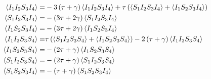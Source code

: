 \documentclass{report}
\begin{document}
 \begin{equation*}
 	\begin{aligned}	
 	\langle I_1I_2S_3I_4 \rangle = &- 3\left(  \tau +\gamma \right) \langle  I_1 I_2 S_3 I_4 \rangle + \tau \left( \langle  S_1 I_2 S_3 I_4  \rangle +\langle  I_1 S_2 S_3 I_4 \rangle \right) \\
 	\langle S_1I_2S_3I_4 \rangle=& -\left(  3\tau + 2\gamma \right)  	\langle S_1I_2S_3I_4 \rangle\\
 	\langle I_1S_2S_3I_4 \rangle=&-\left(  3\tau + 2\gamma \right)\langle I_1S_2S_3I_4 \rangle\\
 	\langle I_1I_2S_3S_4 \rangle=& \tau \left( \langle S_1 I_2 S_3S_4 \rangle +\langle  I_1 S_2 S_3S_4 \rangle \right) -2\left(  \tau+\gamma \right) \langle I_1I_2S_3S_4 \rangle\\
 	\langle I_1S_2S_3S_4 \rangle=&-\left(  2\tau + \gamma \right) \langle I_1S_2S_3S_4 \rangle\\
 	\langle S_1I_2S_3S_4 \rangle=&-\left(  2\tau + \gamma \right) \langle S_1I_2S_3S_4 \rangle\\
 	\langle S_1S_2S_3I_4 \rangle=&-\left(  \tau + \gamma \right) \langle S_1S_2S_3I_4 \rangle\\	
 	\end{aligned}
\end{equation*}
\end{document}
